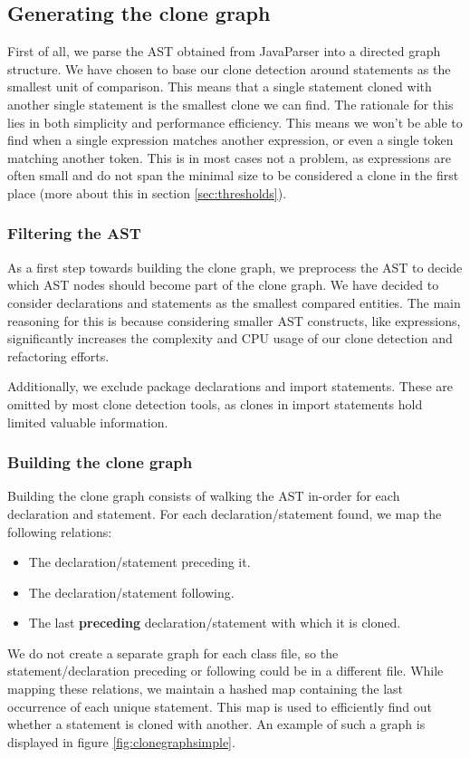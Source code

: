 \subsection{Generating the clone graph}\label{sec:clonegraph}
First of all, we parse the AST obtained from JavaParser into a directed graph structure. We have chosen to base our clone detection around statements as the smallest unit of comparison. This means that a single statement cloned with another single statement is the smallest clone we can find. The rationale for this lies in both simplicity and performance efficiency. This means we won't be able to find when a single expression matches another expression, or even a single token matching another token. This is in most cases not a problem, as expressions are often small and do not span the minimal size to be considered a clone in the first place (more about this in section \ref{sec:thresholds}).

\subsubsection{Filtering the AST}
As a first step towards building the clone graph, we preprocess the AST to decide which AST nodes should become part of the clone graph. We have decided to consider declarations and statements as the smallest compared entities. The main reasoning for this is because considering smaller AST constructs, like expressions, significantly increases the complexity and CPU usage of our clone detection and refactoring efforts.

Additionally, we exclude package declarations and import statements. These are omitted by most clone detection tools, as clones in import statements hold limited valuable information.

\subsubsection{Building the clone graph}\label{sec:buildingclonegraph}
Building the clone graph consists of walking the AST in-order for each declaration and statement. For each declaration/statement found, we map the following relations:
\begin{itemize}
  \item The declaration/statement preceding it.
  \item The declaration/statement following.
  \item The last \textbf{preceding} declaration/statement with which it is cloned.
\end{itemize}
We do not create a separate graph for each class file, so the statement/declaration preceding or following could be in a different file. While mapping these relations, we maintain a hashed map containing the last occurrence of each unique statement. This map is used to efficiently find out whether a statement is cloned with another. An example of such a graph is displayed in figure \ref{fig:clonegraphsimple}.

